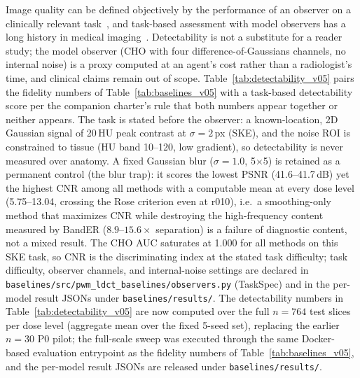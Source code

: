 \documentclass[twoside,11pt]{article}
\begin{document}
Image quality can be defined objectively by the performance of an observer on a clinically relevant task~\citep{barrett1993model,barrett2004foundations,wagner1985unified}, and task-based assessment with model observers has a long history in medical imaging~\citep{abbey2001human,samei2015assessment}. Detectability is not a substitute for a reader study; the model observer (CHO with four difference-of-Gaussians channels, no internal noise) is a proxy computed at an agent's cost rather than a radiologist's time, and clinical claims remain out of scope. Table~\ref{tab:detectability_v05} pairs the fidelity numbers of Table~\ref{tab:baselines_v05} with a task-based detectability score per the companion charter's rule that both numbers appear together or neither appears. The task is stated before the observer: a known-location, 2D Gaussian signal of 20\,HU peak contrast at $\sigma = 2$\,px (SKE), and the noise ROI is constrained to tissue (HU band 10--120, low gradient), so detectability is never measured over anatomy. A fixed Gaussian blur ($\sigma = 1.0$, 5$\times$5) is retained as a permanent control (the blur trap): it scores the lowest PSNR (41.6--41.7\,dB) yet the highest CNR among all methods with a computable mean at every dose level (5.75--13.04, crossing the Rose criterion even at r010), i.e.\ a smoothing-only method that maximizes CNR while destroying the high-frequency content measured by BandER ($8.9$--$15.6\times$ separation) is a failure of diagnostic content, not a mixed result. The CHO AUC saturates at 1.000 for all methods on this SKE task, so CNR is the discriminating index at the stated task difficulty; task difficulty, observer channels, and internal-noise settings are declared in \texttt{baselines/src/pwm\_ldct\_baselines/observers.py} (TaskSpec) and in the per-model result JSONs under \texttt{baselines/results/}. The detectability numbers in Table~\ref{tab:detectability_v05} are now computed over the full $n = 764$ test slices per dose level (aggregate mean over the fixed 5-seed set), replacing the earlier $n = 30$ P0 pilot; the full-scale sweep was executed through the same Docker-based evaluation entrypoint as the fidelity numbers of Table~\ref{tab:baselines_v05}, and the per-model result JSONs are released under \texttt{baselines/results/}.
\end{document}
